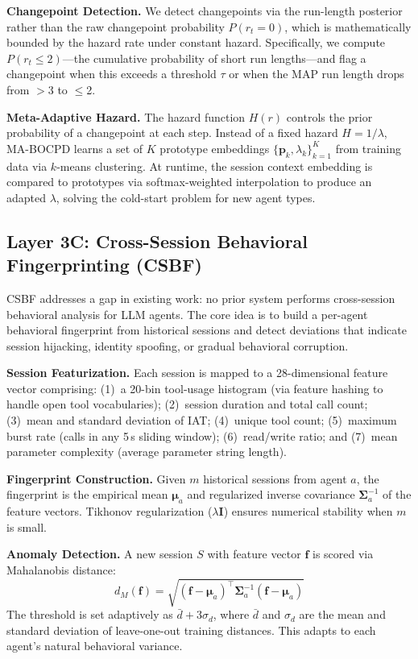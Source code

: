 \documentclass[conference,compsoc]{IEEEtran}
\begin{document}
\textbf{Changepoint Detection.} We detect changepoints via the run-length posterior rather than the raw changepoint probability $P(r_t = 0)$, which is mathematically bounded by the hazard rate under constant hazard. Specifically, we compute $P(r_t \leq 2)$---the cumulative probability of short run lengths---and flag a changepoint when this exceeds a threshold $\tau$ or when the MAP run length drops from $>$3 to $\leq$2.

\textbf{Meta-Adaptive Hazard.} The hazard function $H(r)$ controls the prior probability of a changepoint at each step. Instead of a fixed hazard $H = 1/\lambda$, MA-BOCPD learns a set of $K$ prototype embeddings $\{\mathbf{p}_k, \lambda_k\}_{k=1}^K$ from training data via $k$-means clustering. At runtime, the session context embedding is compared to prototypes via softmax-weighted interpolation to produce an adapted $\lambda$, solving the cold-start problem for new agent types.

\subsection{Layer 3C: Cross-Session Behavioral Fingerprinting (CSBF)}
\label{sec:csbf}

CSBF addresses a gap in existing work: no prior system performs cross-session behavioral analysis for LLM agents. The core idea is to build a per-agent behavioral fingerprint from historical sessions and detect deviations that indicate session hijacking, identity spoofing, or gradual behavioral corruption.

\textbf{Session Featurization.} Each session is mapped to a 28-dimensional feature vector comprising: (1)~a 20-bin tool-usage histogram (via feature hashing to handle open tool vocabularies); (2)~session duration and total call count; (3)~mean and standard deviation of IAT; (4)~unique tool count; (5)~maximum burst rate (calls in any 5\,s sliding window); (6)~read/write ratio; and (7)~mean parameter complexity (average parameter string length).

\textbf{Fingerprint Construction.} Given $m$ historical sessions from agent $a$, the fingerprint is the empirical mean $\boldsymbol{\mu}_a$ and regularized inverse covariance $\boldsymbol{\Sigma}_a^{-1}$ of the feature vectors. Tikhonov regularization ($\lambda \mathbf{I}$) ensures numerical stability when $m$ is small.

\textbf{Anomaly Detection.} A new session $S$ with feature vector $\mathbf{f}$ is scored via Mahalanobis distance:
\begin{equation}
d_M(\mathbf{f}) = \sqrt{(\mathbf{f} - \boldsymbol{\mu}_a)^\top \boldsymbol{\Sigma}_a^{-1} (\mathbf{f} - \boldsymbol{\mu}_a)}
\end{equation}
The threshold is set adaptively as $\bar{d} + 3\sigma_d$, where $\bar{d}$ and $\sigma_d$ are the mean and standard deviation of leave-one-out training distances. This adapts to each agent's natural behavioral variance.
\end{document}
